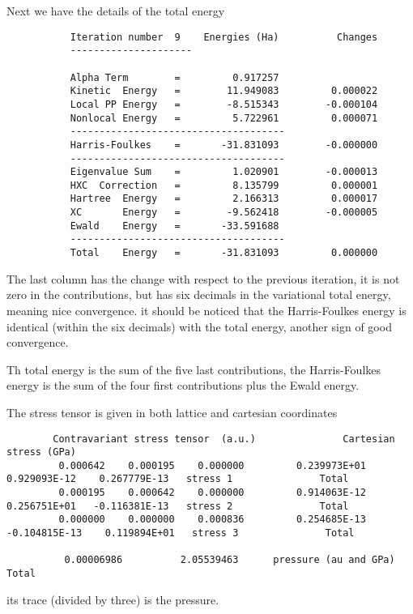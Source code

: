 \documentclass[11pt]{article}
\begin{document}
Next we have the details of the total energy
\begin{verbatim}
           Iteration number  9    Energies (Ha)          Changes
           ---------------------

           Alpha Term        =         0.917257
           Kinetic  Energy   =        11.949083         0.000022
           Local PP Energy   =        -8.515343        -0.000104
           Nonlocal Energy   =         5.722961         0.000071
           -------------------------------------
           Harris-Foulkes    =       -31.831093        -0.000000
           -------------------------------------
           Eigenvalue Sum    =         1.020901        -0.000013
           HXC  Correction   =         8.135799         0.000001
           Hartree  Energy   =         2.166313         0.000017
           XC       Energy   =        -9.562418        -0.000005
           Ewald    Energy   =       -33.591688
           -------------------------------------
           Total    Energy   =       -31.831093         0.000000
\end{verbatim}
The last column has the change with respect to the previous iteration,
it is not zero in the contributions, but has six decimals in the variational
total energy, meaning nice convergence.
it should be noticed that the Harris-Foulkes energy is identical (within the
six decimals) with the total energy, another sign of good convergence.

Th total energy is the sum of the five last contributions,
the Harris-Foulkes energy is the sum of the four first contributions
plus the Ewald energy.

The stress tensor is given in both lattice and cartesian coordinates
\begin{verbatim}
        Contravariant stress tensor  (a.u.)               Cartesian stress (GPa)
         0.000642    0.000195    0.000000         0.239973E+01    0.929093E-12    0.267779E-13   stress 1               Total
         0.000195    0.000642    0.000000         0.914063E-12    0.256751E+01   -0.116381E-13   stress 2               Total
         0.000000    0.000000    0.000836         0.254685E-13   -0.104815E-13    0.119894E+01   stress 3               Total

          0.00006986          2.05539463      pressure (au and GPa)                Total
\end{verbatim}
its trace (divided by three) is the pressure.
\end{document}
